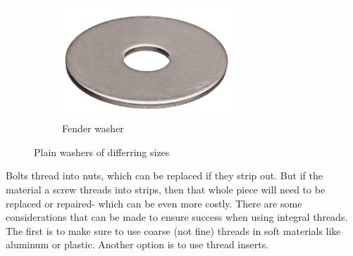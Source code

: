 \documentclass[10pt,letterpaper]{book}
\begin{document}
\begin{figure}[H]
\begin{subfigure}[b]{.24\linewidth}
			\includegraphics[width=0.7\textwidth]{imgs/fenderwasher.png}
			\caption{Fender washer}
		\end{subfigure}
		\caption{Plain washers of differring sizes}
	\end{figure}
	
	Bolts thread into nuts, which can be replaced if they strip out. But if the material a screw threads into strips, then that whole piece will need to be replaced or repaired- which can be even more costly. There are some considerations that can be made to ensure success when using integral threads. The first is to make sure to use coarse (not fine) threads in soft materials like aluminum or plastic. Another option is to use thread inserts.
	
\end{document}
